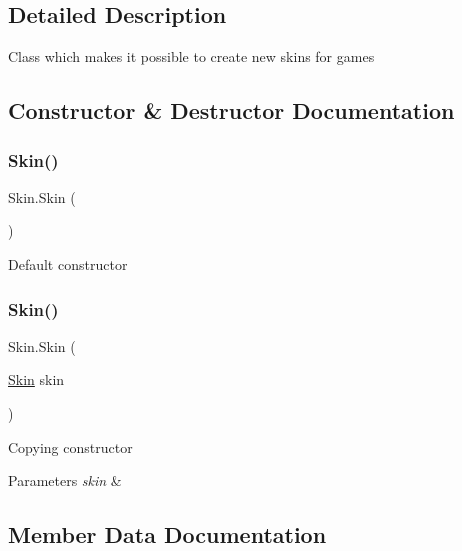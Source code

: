 \subsection{Detailed Description}
Class which makes it possible to create new skins for games 



\subsection{Constructor \& Destructor Documentation}
\mbox{\label{class_skin_a86f78acdf98d955dfc0f12f9789ae063}} 
\subsubsection{\texorpdfstring{Skin()}{Skin()}\hspace{0.1cm}{\footnotesize\ttfamily [1/2]}}
{\footnotesize\ttfamily Skin.\+Skin (\begin{DoxyParamCaption}{ }\end{DoxyParamCaption})}



Default constructor 

\mbox{\label{class_skin_a8d2828252e54b57fc361b9eefceb6574}} 
\subsubsection{\texorpdfstring{Skin()}{Skin()}\hspace{0.1cm}{\footnotesize\ttfamily [2/2]}}
{\footnotesize\ttfamily Skin.\+Skin (\begin{DoxyParamCaption}\item[{\mbox{\hyperlink{class_skin}{Skin}}}]{skin }\end{DoxyParamCaption})}



Copying constructor 


\begin{DoxyParams}{Parameters}
{\em skin} & \\
\hline
\end{DoxyParams}


\subsection{Member Data Documentation}
\mbox{\label{class_skin_aca692cdd02d768e2e8b1c05461e11172}} 

